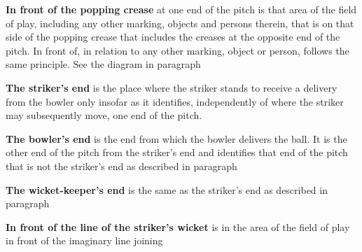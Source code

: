 \documentclass[12pt]{article}
\begin{document}
\vspace{\baselineskip}
\begin{adjustwidth}{0.4in}{0.15in}
{\fontsize{9pt}{10.8pt} \tabto{0.39in} \textbf{In front of the popping crease }at one end of the pitch is that area of the field of play, including any other\textbf{ }marking, objects and persons therein, that is on that side of the popping crease that includes the creases at the opposite end of the pitch. In front of, in relation to any other marking, object or person, follows the same principle. See the diagram in paragraph \par}\par

\end{adjustwidth}


\vspace{\baselineskip}
\begin{adjustwidth}{0.4in}{0.1in}
\begin{justify}
{\fontsize{9pt}{10.8pt} \tabto{0.39in} \textbf{The striker’s end }is the place where the striker stands to receive a delivery from the bowler only insofar as it\textbf{ }identifies, independently of where the striker may subsequently move, one end of the pitch.\par}
\end{justify}\par

\end{adjustwidth}


\vspace{\baselineskip}
\begin{adjustwidth}{0.4in}{0.14in}
{\fontsize{9pt}{10.8pt} \tabto{0.39in} \textbf{The bowler’s end }is the end from which the bowler delivers the ball. It is the other end of the pitch from the\textbf{ }striker’s end and identifies that end of the pitch that is not the striker’s end as described in paragraph \par}\par

\end{adjustwidth}


\vspace{\baselineskip}
{\fontsize{9pt}{10.8pt} \tabto{0.39in} \textbf{The wicket-keeper’s end }is the same as the striker’s end as described in paragraph\textbf{ }\par}\par


\vspace{\baselineskip}
{\fontsize{9pt}{10.8pt} \tabto{0.39in} {\fontsize{8pt}{9.6pt}\selectfont \textbf{In front of the line of the striker’s wicket }is in the area of the field of play in front of the imaginary line joining\par}\par}\par
\end{document}
